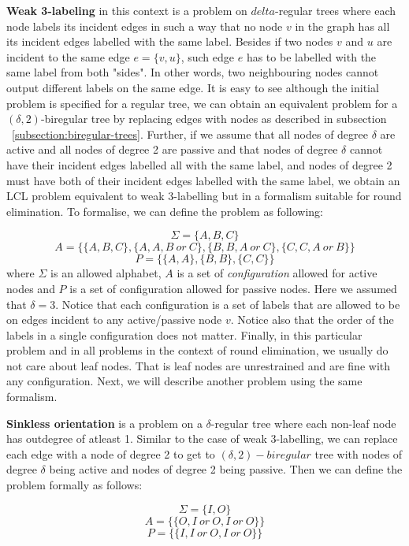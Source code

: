 \textbf{Weak 3-labeling} in this context is a problem on $delta$-regular trees where
each node labels its incident edges in such a way that no node $v$ in the graph
has all its incident edges labelled with the same label. Besides if two
nodes $v$ and $u$ are incident to the same edge $e = \{v, u\}$, such
edge $e$ has to be labelled with the same label from both "sides". In other words,
two neighbouring nodes cannot output different labels on the same edge.
It is easy to see although the initial problem is specified for a regular
tree, we can obtain an equivalent problem for a $(\delta, 2)$-biregular tree
by replacing edges with nodes as described in subsection ~\ref{subsection:biregular-trees}.
Further, if we assume that all nodes of degree $\delta$ are active and all nodes of 
degree 2 are passive and that nodes of degree $\delta$ cannot have their incident
edges labelled all with the same label, and nodes of degree 2 must have both of their
incident edges labelled with the same label, we obtain an LCL problem equivalent to
weak 3-labelling but in a formalism suitable for round elimination. To formalise, we
can define the problem as following:

$$\Sigma = \{A, B, C\}$$
$$A = \{ \{A, B, C\}, \{A, A, B~or~C\}, \{B, B, A~or~C\}, \{C, C, A~or~B\} \}$$
$$P = \{ \{A, A\}, \{B, B\}, \{C, C\}\}$$
where $\Sigma$ is an allowed alphabet, $A$ is a set of \emph{configuration}
allowed for active nodes and $P$ is a set of configuration allowed for
passive nodes. Here we assumed that $\delta = 3$. Notice that each
configuration is a set of labels that are allowed to be on edges 
incident to any active/passive node $v$. Notice also that the order of
the labels in a single configuration does not matter. Finally, in this particular problem
and in all problems in the context of round elimination, we usually do not care about
leaf nodes. That is leaf nodes are unrestrained and are fine with any 
configuration.  Next, we will
describe another problem using the same formalism.

\textbf{Sinkless orientation} is a problem on a $\delta$-regular tree
where each non-leaf node has outdegree of atleast 1. Similar to the case of weak 3-labelling,
we can replace each edge with a node of degree 2 to get to $(\delta, 2)-biregular$ tree with
nodes of degree $\delta$ being active and nodes of degree 2 being passive.
Then we can define the problem formally as follows:

$$\Sigma = \{I, O\}$$
$$A = \{ \{O, I~or~O, I~or~O\} \}$$
$$P = \{ \{I, I~or~O, I~or~O\}\}$$


